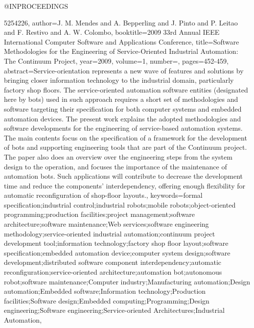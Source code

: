 @INPROCEEDINGS{5254226, 
author={J. M. Mendes and A. Bepperling and J. Pinto and P. Leitao and F. Restivo and A. W. Colombo}, 
booktitle={2009 33rd Annual IEEE International Computer Software and Applications Conference}, 
title={Software Methodologies for the Engineering of Service-Oriented Industrial Automation: The Continuum Project}, 
year={2009}, 
volume={1}, 
number={}, 
pages={452-459}, 
abstract={Service-orientation represents a new wave of features and solutions by bringing closer information technology to the industrial domain, particularly factory shop floors. The service-oriented automation software entities (designated here by bots) used in such approach requires a short set of methodologies and software targeting their specification for both computer systems and embedded automation devices. The present work explains the adopted methodologies and software developments for the engineering of service-based automation systems. The main contents focus on the specification of a framework for the development of bots and supporting engineering tools that are part of the Continuum project. The paper also does an overview over the engineering steps from the system design to the operation, and focuses the importance of the maintenance of automation bots. Such applications will contribute to decrease the development time and reduce the components' interdependency, offering enough flexibility for automatic reconfiguration of shop-floor layouts.}, 
keywords={formal specification;industrial control;industrial robots;mobile robots;object-oriented programming;production facilities;project management;software architecture;software maintenance;Web services;software engineering methodology;service-oriented industrial automation;continuum project development tool;information technology;factory shop floor layout;software specification;embedded automation device;computer system design;software development;distributed software component interdependency;automatic reconfiguration;service-oriented architecture;automation bot;autonomous robot;software maintenance;Computer industry;Manufacturing automation;Design automation;Embedded software;Information technology;Production facilities;Software design;Embedded computing;Programming;Design engineering;Software engineering;Service-oriented Architectures;Industrial Automation}, 

}
